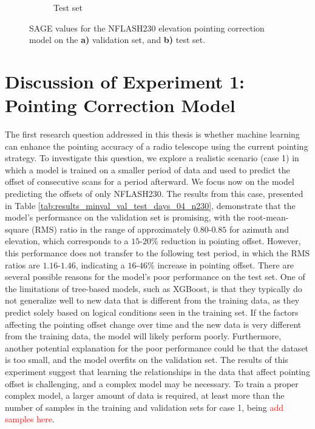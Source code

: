\begin{figure}[H]
\begin{subfigure}[t]{0.92\textwidth}
       \caption{Test set}
       \label{subfig:sage_lastfold_nflash230_el_test}
    \end{subfigure}
    \caption{SAGE values for the NFLASH230 elevation pointing correction model on the \textbf{a)} validation set, and \textbf{b)} test set.}
    \label{fig:sage_lastfold_nflash230_el}
\end{figure}


\section{Discussion of Experiment 1: Pointing Correction Model}
The first research question addressed in this thesis is whether machine learning can enhance the pointing accuracy of a radio telescope using the current pointing strategy.
To investigate this question, we explore a realistic scenario (case 1) in which a model is trained on a smaller period of data and used to predict the offset of consecutive scans for a period afterward.
We focus now on the model predicting the offsets of only NFLASH230.
The results from this case, presented in Table \ref{tab:results_minval_val_test_days_04_n230}, demonstrate that the model's performance on the validation set is promising,
with the root-mean-square (RMS) ratio in the range of approximately $0.80$-$0.85$ for azimuth and elevation,
which corresponds to a $15$-$20\%$ reduction in pointing offset.
However, this performance does not transfer to the following test period,
in which the RMS ratios are $1.16$-$1.46$, indicating a $16$-$46\%$ increase in pointing offset.
There are several possible reasons for the model's poor performance on the test set.
One of the limitations of tree-based models, such as XGBoost, is that they typically do not generalize well to new data that is different from the training data,
as they predict solely based on logical conditions seen in the training set.
If the factors affecting the pointing offset change over time and the new data is very different from the training data, the model will likely perform poorly. 
Furthermore, another potential explanation for the poor performance could be that the dataset is too small, and the model overfits on the validation set.
The results of this experiment suggest that learning the relationships in the data that affect pointing offset is challenging, and a complex model may be necessary.
To train a proper complex model, a larger amount of data is required, at least more than the number of samples in the training and validation sets for case 1, being \textcolor{red}{add samples here}.
